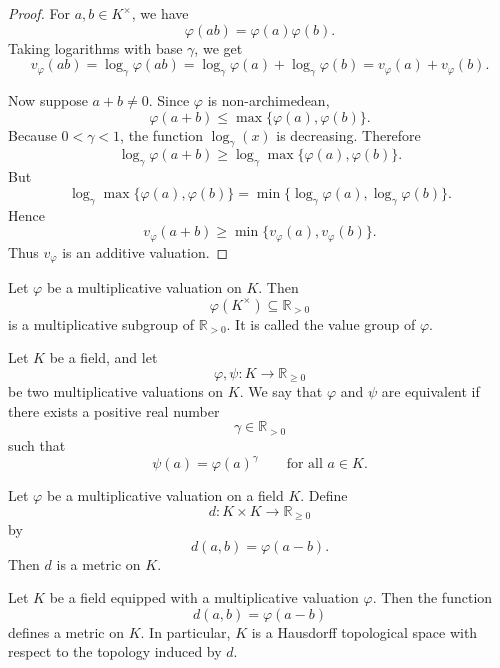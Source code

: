 \begin{proof}
    For \(a,b\in K^\times\), we have
    \[
        \varphi(ab)=\varphi(a)\varphi(b).
    \]
    Taking logarithms with base \(\gamma\), we get
    \[
        v_\varphi(ab)
        =
        \log_\gamma \varphi(ab)
        =
        \log_\gamma \varphi(a)+\log_\gamma \varphi(b)
        =
        v_\varphi(a)+v_\varphi(b).
    \]

    Now suppose \(a+b\neq 0\). Since \(\varphi\) is non-archimedean,
    \[
        \varphi(a+b)\leq \max\{\varphi(a),\varphi(b)\}.
    \]
    Because \(0<\gamma<1\), the function \(\log_\gamma(x)\) is decreasing. Therefore
    \[
        \log_\gamma \varphi(a+b)
        \geq
        \log_\gamma \max\{\varphi(a),\varphi(b)\}.
    \]
    But
    \[
        \log_\gamma \max\{\varphi(a),\varphi(b)\}
        =
        \min\{\log_\gamma \varphi(a),\log_\gamma \varphi(b)\}.
    \]
    Hence
    \[
        v_\varphi(a+b)\geq \min\{v_\varphi(a),v_\varphi(b)\}.
    \]
    Thus \(v_\varphi\) is an additive valuation.
\end{proof}

\begin{definition}
    Let \(\varphi\) be a multiplicative valuation on \(K\). Then
    \[
        \varphi(K^\times)\subseteq \mathbb{R}_{>0}
    \]
    is a multiplicative subgroup of \(\mathbb{R}_{>0}\). It is called the value group
    of \(\varphi\).
\end{definition}

\begin{definition}
    Let \(K\) be a field, and let
    \[
        \varphi,\psi:K\longrightarrow \mathbb{R}_{\geq 0}
    \]
    be two multiplicative valuations on \(K\). We say that \(\varphi\) and \(\psi\)
    are equivalent if there exists a positive real number
    \[
        \gamma\in \mathbb{R}_{>0}
    \]
    such that
    \[
        \psi(a)=\varphi(a)^{\gamma}
        \qquad
        \text{for all } a\in K.
    \]
\end{definition}

\begin{definition}
    Let \(\varphi\) be a multiplicative valuation on a field \(K\). Define
    \[
        d:K\times K\longrightarrow \mathbb{R}_{\geq 0}
    \]
    by
    \[
        d(a,b)=\varphi(a-b).
    \]
    Then \(d\) is a metric on \(K\).
\end{definition}

\begin{proposition}
    Let \(K\) be a field equipped with a multiplicative valuation \(\varphi\).
    Then the function
    \[
        d(a,b)=\varphi(a-b)
    \]
    defines a metric on \(K\). In particular, \(K\) is a Hausdorff topological space
    with respect to the topology induced by \(d\).
\end{proposition}

